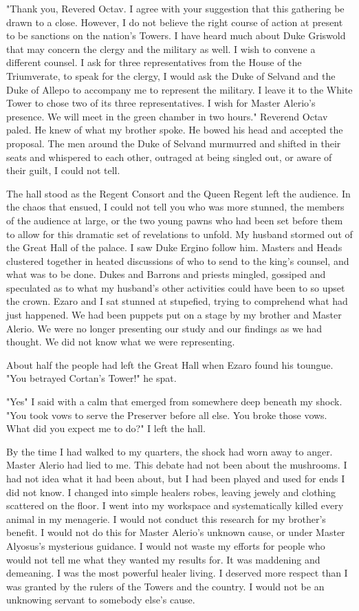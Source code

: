 \documentclass{article}
\begin{document}
"Thank you, Revered Octav. I agree with your suggestion that this gathering be drawn to a close. However, I do not believe the right course of action at present to be sanctions on the nation's Towers. I have heard much about Duke Griswold that may concern the clergy and the military as well. I wish to convene a different counsel. I ask for three representatives from the House of the Triumverate, to speak for the clergy, I would ask the Duke of Selvand and the Duke of Allepo to accompany me to represent the military. I leave it to the White Tower to chose two of its three representatives. I wish for Master Alerio's presence. We will meet in the green chamber in two hours." Reverend Octav paled. He knew of what my brother spoke. He bowed his head and accepted the proposal. The men around the Duke of Selvand murmurred and shifted in their seats and whispered to each other, outraged at being singled out, or aware of their guilt, I could not tell.

The hall stood as the Regent Consort and the Queen Regent left the audience. In the chaos that ensued, I could not tell you who was more stunned, the members of the audience at large, or the two young pawns who had been set before them to allow for this dramatic set of revelations to unfold. My husband stormed out of the Great Hall of the palace. I saw Duke Ergino follow him. Masters and Heads clustered together in heated discussions of who to send to the king's counsel, and what was to be done. Dukes and Barrons and priests mingled, gossiped and speculated as to what my husband's other activities could have been to so upset the crown. Ezaro and I sat stunned at stupefied, trying to comprehend what had just happened. We had been puppets put on a stage by my brother and Master Alerio. We were no longer presenting our study and our findings as we had thought. We did not know what we were representing.

About half the people had left the Great Hall when Ezaro found his toungue. "You betrayed Cortan's Tower!" he spat.

"Yes" I said with a calm that emerged from somewhere deep beneath my shock. "You took vows to serve the Preserver before all else. You broke those vows. What did you expect me to do?" I left the hall.

By the time I had walked to my quarters, the shock had worn away to anger. Master Alerio had lied to me. This debate had not been about the mushrooms. I had not idea what it had been about, but I had been played and used for ends I did not know. I changed into simple healers robes, leaving jewely and clothing scattered on the floor. I went into my workspace and systematically killed every animal in my menagerie. I would not conduct this research for my brother's benefit. I would not do this for Master Alerio's unknown cause, or under Master Alyosus's mysterious guidance. I would not waste my efforts for people who would not tell me what they wanted my results for. It was maddening and demeaning. I was the most powerful healer living. I deserved more respect than I was granted by the rulers of the Towers and the country. I would not be an unknowing servant to somebody else's cause.
\end{document}
